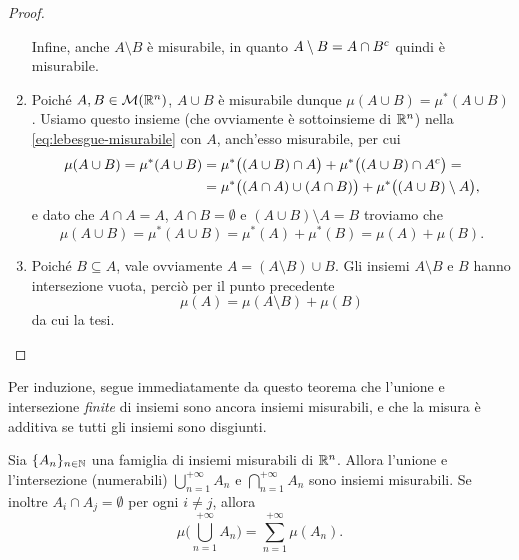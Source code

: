 \begin{proof}
\begin{enumerate}
			Infine, anche $A\setminus B$ è misurabile, in quanto $A\setminus B=A\cap{B}^c$ quindi è misurabile.
		\item Poich\'e $A,B\in\mathcal M(\mathbb{R}^n)$, $A\cup B$ è misurabile dunque $\mu(A\cup B)=\mu^*(A\cup B)$.
			Usiamo questo insieme (che ovviamente è sottoinsieme di $\mathbb{R}^n$) nella \eqref{eq:lebesgue-misurabile} con $A$, anch'esso misurabile, per cui
			\begin{equation}
				\begin{split}
					\mu(A\cup B)=\mu^*(A\cup B)&=\mu^*\big((A\cup B)\cap A\big)+\mu^*\big((A\cup B)\cap{A}^c\big)=\\
					&=\mu^*\big((A\cap A)\cup(A\cap B)\big)+\mu^*\big((A\cup B)\setminus A\big),
				\end{split}
			\end{equation}
			e dato che $A\cap A=A$, $A\cap B=\emptyset$ e $(A\cup B)\setminus A=B$ troviamo che
			\begin{equation}
				\mu(A\cup B)=\mu^*(A\cup B)=\mu^*(A)+\mu^*(B)=\mu(A)+\mu(B).
			\end{equation}
		\item Poich\'e $B\subseteq A$, vale ovviamente $A=(A\setminus B)\cup B$.
			Gli insiemi $A\setminus B$ e $B$ hanno intersezione vuota, perciò per il punto precedente
			\begin{equation}
				\mu(A)=\mu(A\setminus B)+\mu(B)
			\end{equation}
			da cui la tesi.\qedhere
	\end{enumerate}
\end{proof}
Per induzione, segue immediatamente da questo teorema che l'unione e intersezione \emph{finite} di insiemi sono ancora insiemi misurabili, e che la misura è additiva se tutti gli insiemi sono disgiunti.
\begin{proprieta} \label{pr:additivita-numerabile-lebesgue}
	Sia $\{A_n\}_{n\in\mathbb{N}}$ una famiglia di insiemi misurabili di $\mathbb{R}^n$.
	Allora l'unione e l'intersezione (numerabili) $\bigcup_{n=1}^{+\infty}A_n$ e $\bigcap_{n=1}^{+\infty}A_n$ sono insiemi misurabili.
	Se inoltre $A_i\cap A_j=\emptyset$ per ogni $i\neq j$, allora
	\begin{equation}
		\mu\bigg(\bigcup_{n=1}^{+\infty}A_n\bigg)=\sum_{n=1}^{+\infty}\mu(A_n).
		\label{eq:additivita-numerabile-lebesgue}
	\end{equation}
\end{proprieta}
